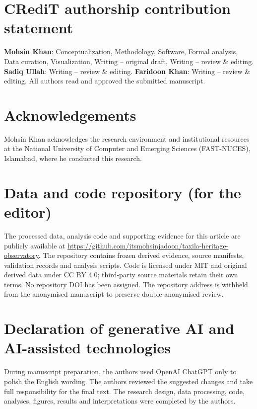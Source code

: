 \documentclass[11pt,a4paper]{article}
\begin{document}
\section*{CRediT authorship contribution statement}
\textbf{Mohsin Khan}: Conceptualization, Methodology, Software, Formal analysis,
Data curation, Visualization, Writing -- original draft, Writing -- review \&
editing. \textbf{Sadiq Ullah}: Writing -- review \& editing.
\textbf{Faridoon Khan}: Writing -- review \& editing.
All authors read and approved the submitted manuscript.

\section*{Acknowledgements}
Mohsin Khan acknowledges the research environment and institutional resources at the National University of Computer and Emerging Sciences (FAST-NUCES), Islamabad, where he conducted this research.

\section*{Data and code repository (for the editor)}
The processed data, analysis code and supporting evidence for this article are publicly available at \url{https://github.com/itsmohsinjadoon/taxila-heritage-observatory}. The repository contains frozen derived evidence, source manifests, validation records and analysis scripts. Code is licensed under MIT and original derived data under CC BY 4.0; third-party source materials retain their own terms. No repository DOI has been assigned. The repository address is withheld from the anonymised manuscript to preserve double-anonymised review.

\section*{Declaration of generative AI and AI-assisted technologies}
During manuscript preparation, the authors used OpenAI ChatGPT only to polish the English wording. The authors reviewed the suggested changes and take full responsibility for the final text. The research design, data processing, code, analyses, figures, results and interpretations were completed by the authors.
\end{document}
